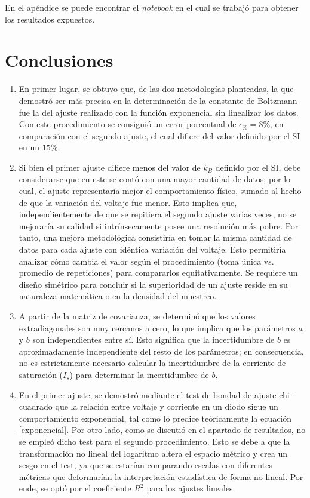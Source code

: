 \documentclass[twocolumn]{article} %
\begin{document}
En el apéndice se puede encontrar el \textit{notebook} en el cual se trabajó para obtener los resultados expuestos.



\section{Conclusiones}

\begin{enumerate}
    \item En primer lugar, se obtuvo que, de las dos metodologías planteadas, la que demostró ser más precisa en la determinación de la constante de Boltzmann fue la del ajuste realizado con la función exponencial sin linealizar los datos. Con este procedimiento se consiguió un error porcentual de $\epsilon_{\%}=8\%$, en comparación con el segundo ajuste, el cual difiere del valor definido por el SI en un $15\%$.

    \item Si bien el primer ajuste difiere menos del valor de $k_B$ definido por el SI, debe considerarse que en este se contó con una mayor cantidad de datos; por lo cual, el ajuste representaría mejor el comportamiento físico, sumado al hecho de que la variación del voltaje fue menor. Esto implica que, independientemente de que se repitiera el segundo ajuste varias veces, no se mejoraría su calidad si intrínsecamente posee una resolución más pobre. Por tanto, una mejora metodológica consistiría en tomar la misma cantidad de datos para cada ajuste con idéntica variación del voltaje. Esto permitiría analizar cómo cambia el valor según el procedimiento (toma única vs. promedio de repeticiones) para compararlos equitativamente. Se requiere un diseño simétrico para concluir si la superioridad de un ajuste reside en su naturaleza matemática o en la densidad del muestreo.
    
    \item A partir de la matriz de covarianza, se determinó que los valores extradiagonales son muy cercanos a cero, lo que implica que los parámetros $a$ y $b$ son independientes entre sí. Esto significa que la incertidumbre de $b$ es aproximadamente independiente del resto de los parámetros; en consecuencia, no es estrictamente necesario calcular la incertidumbre de la corriente de saturación ($I_s$) para determinar la incertidumbre de $b$.
    
    \item En el primer ajuste, se demostró mediante el test de bondad de ajuste chi-cuadrado que la relación entre voltaje y corriente en un diodo sigue un comportamiento exponencial, tal como lo predice teóricamente la ecuación \eqref{exponencial}. Por otro lado, como se discutió en el apartado de resultados, no se empleó dicho test para el segundo procedimiento. Esto se debe a que la transformación no lineal del logaritmo altera el espacio métrico y crea un sesgo en el test, ya que se estarían comparando escalas con diferentes métricas que deformarían la interpretación estadística de forma no lineal. Por ende, se optó por el coeficiente $R^2$ para los ajustes lineales.
    

\end{enumerate}
\end{document}
